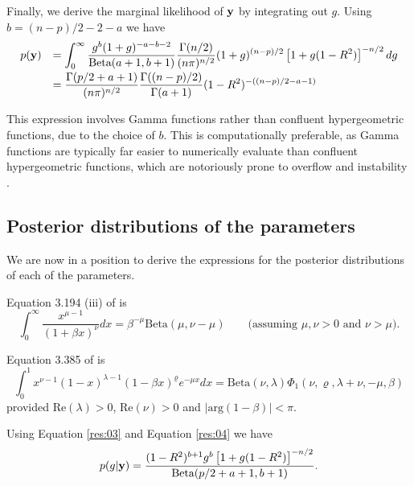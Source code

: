 \documentclass{amsart}[12pt]
\begin{document}
\noindent Finally, we derive the marginal likelihood of ${\bf y}$ by integrating out $g$. Using $b= (n-p)/2 - 2 - a$ we have
$$
\begin{array}{rl}
	\displaystyle p({\bf y}) 
	  & \displaystyle = \int_0^\infty                                         
	\frac{g^{b}(1 + g)^{-a-b-2}}{\mbox{Beta}(a+1,b+1)}
	\frac{\Gamma(n/2)}{(n\pi)^{n/2}} (1 + g)^{(n-p)/2} \left[  1 + g(1 -  R^2) \right]^{-n/2}
	dg
	\\ [2ex]
	  & \displaystyle                                                         
	= \frac{\Gamma( p/2 + a + 1)}{(n\pi)^{n/2}} 
	\frac{\Gamma((n-p)/2)}{\Gamma(a+1)} (1 -  R^2)^{-((n-p)/2 - a - 1)} \\
\end{array}
$$

This expression involves Gamma functions rather than confluent hypergeometric functions, due to the choice of
$b$. This is computationally preferable, as Gamma functions are typically far easier to numerically evaluate
than confluent hypergeometric functions, which are notoriously prone to overflow and instability
\citep{Pearson2014}.

\subsection{Posterior distributions of the parameters}
We are now in a position to derive the expressions for the posterior distributions of each of the parameters.

Equation 3.194 (iii) of \citep{Gradshteyn1988} is
\begin{equation}\label{res:03}
	\int_0^\infty \frac{ x^{\mu - 1} }{(1 + \beta x)^\nu} dx = \beta^{-\mu} \mbox{Beta}(\mu,\nu - \mu) \quad \quad \mbox{(assuming $\mu,\nu>0$ and $\nu>\mu$).}
\end{equation}

Equation 3.385 of \citep{Gradshteyn1988} is
\begin{equation} \label{res:04}
	\int_{0}^1 x^{\nu - 1} (1 - x)^{\lambda - 1}(1 - \beta x)^{\varrho} e^{-\mu x} dx = \mbox{Beta}(\nu,\lambda) \Phi_1(\nu,\varrho,\lambda+\nu,-\mu,\beta)
\end{equation}
\noindent provided $\mbox{Re}(\lambda)>0$, $\mbox{Re}(\nu)>0$ and $|\mbox{arg}(1-\beta)|<\pi$.

Using Equation \ref{res:03} and Equation \ref{res:04} we have
\begin{equation}\label{res:06}
	p(g|{\bf y}) = \frac{(1 -  R^2)^{b+1} g^{b} \left[  1 + g(1 -  R^2) \right]^{-n/2}}{\mbox{Beta}(p/2 + a + 1,b+1)}.
\end{equation}
\end{document}
